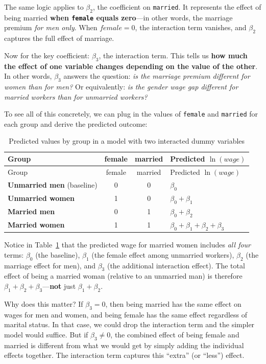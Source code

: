 \documentclass[
  letterpaper,
  DIV=11,
  numbers=noendperiod]{scrreprt}
\begin{document}
The same logic applies to \(\beta_2\), the coefficient on
\texttt{married}. It represents the effect of being married \textbf{when
\texttt{female} equals zero}---in other words, the marriage premium
\emph{for men only}. When \(female = 0\), the interaction term vanishes,
and \(\beta_2\) captures the full effect of marriage.

Now for the key coefficient: \(\beta_3\), the interaction term. This
tells us \textbf{how much the effect of one variable changes depending
on the value of the other}. In other words, \(\beta_3\) answers the
question: \emph{is the marriage premium different for women than for
men?} Or equivalently: \emph{is the gender wage gap different for
married workers than for unmarried workers?}

To see all of this concretely, we can plug in the values of
\texttt{female} and \texttt{married} for each group and derive the
predicted outcome:

\begin{longtable}[]{@{}lccl@{}}
\caption{Predicted values by group in a model with two interacted dummy
variables}\label{tbl-interaction-groups}\tabularnewline
\toprule\noalign{}
Group & female & married & Predicted \(\ln(wage)\) \\
\midrule\noalign{}
\endfirsthead
\toprule\noalign{}
Group & female & married & Predicted \(\ln(wage)\) \\
\midrule\noalign{}
\endhead
\bottomrule\noalign{}
\endlastfoot
\textbf{Unmarried men} (baseline) & 0 & 0 & \(\beta_0\) \\
\textbf{Unmarried women} & 1 & 0 & \(\beta_0 + \beta_1\) \\
\textbf{Married men} & 0 & 1 & \(\beta_0 + \beta_2\) \\
\textbf{Married women} & 1 & 1 &
\(\beta_0 + \beta_1 + \beta_2 + \beta_3\) \\
\end{longtable}

Notice in Table~\ref{tbl-interaction-groups} that the predicted wage for
married women includes \emph{all four} terms: \(\beta_0\) (the
baseline), \(\beta_1\) (the female effect among unmarried workers),
\(\beta_2\) (the marriage effect for men), and \(\beta_3\) (the
additional interaction effect). The total effect of being a married
woman (relative to an unmarried man) is therefore
\(\beta_1 + \beta_2 + \beta_3\)---\textbf{not} just
\(\beta_1 + \beta_2\).

Why does this matter? If \(\beta_3 = 0\), then being married has the
same effect on wages for men and women, and being female has the same
effect regardless of marital status. In that case, we could drop the
interaction term and the simpler model would suffice. But if
\(\beta_3 \neq 0\), the combined effect of being female and married is
different from what we would get by simply adding the individual effects
together. The interaction term captures this ``extra'' (or ``less'')
effect.
\end{document}
